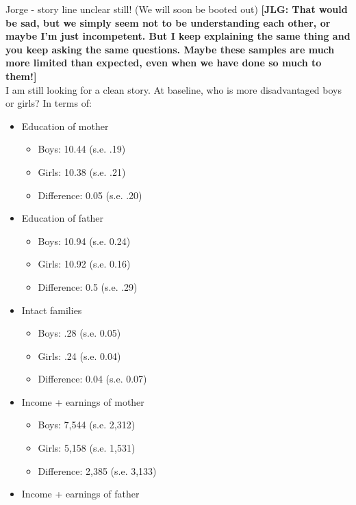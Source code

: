 


\newcommand*\leftright[2]{%
  \leavevmode
  \rlap{#1}%
  \hspace{0.5\linewidth}%
  #2}

\newcommand{\orth}{\ensuremath{\perp\!\!\!\perp}}%
\newcommand{\indep}{\orth}%
\newcommand{\notorth}{\ensuremath{\perp\!\!\!\!\!\!\diagup\!\!\!\!\!\!\perp}}%
\newcommand{\notindep}{\notorth}





\noindent Jorge - story line unclear still! (We will soon be booted out) \textbf{[JLG: That would be sad, but we simply seem not to be understanding each other, or maybe I'm just incompetent. But I keep explaining the same thing and you keep asking the same questions. Maybe these samples are much more limited than expected, even when we have done so much to them!]}\\

\noindent I am still looking for a clean story. At baseline, who is more disadvantaged boys or girls? In terms of:\\


\begin{itemize}
\item Education of mother
	\begin{itemize}
		\item Boys: 10.44 (s.e. .19)
		\item Girls: 10.38 (s.e. .21)
		\item Difference: 0.05 (s.e. .20)
	\end{itemize}
\item Education of father
	\begin{itemize}
		\item Boys: 10.94 (s.e. 0.24)
		\item Girls: 10.92 (s.e. 0.16)
		\item Difference: 0.5 (s.e. .29)
	\end{itemize}
\item Intact families 
	\begin{itemize}
		\item Boys: .28 (s.e. 0.05)
		\item Girls: .24 (s.e. 0.04)
		\item Difference: 0.04 (s.e. 0.07)
	\end{itemize}
\item Income + earnings of mother
	\begin{itemize}
		\item  Boys: 7,544 (s.e. 2,312) 
		\item  Girls: 5,158 (s.e. 1,531)
		\item Difference: 2,385 (s.e. 3,133) 
	\end{itemize}
\item Income + earnings of father
\end{itemize}

